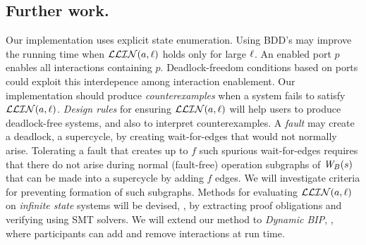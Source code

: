 \subsection{Further work.} 
Our implementation uses explicit state enumeration. %
Using BDD's may improve the running time 
when $\mathcal{LLIN}(a, \ell)$ holds only for large $\ell$.
%
An enabled port $p$ enables all interactions containing $p$.
Deadlock-freedom conditions based on ports could exploit
this interdepence among interaction enablement.
%
Our implementation should produce \emph{counterexamples} when a system
fails to satisfy $\mathcal{LLIN}(a, \ell)$.
%
\emph{Design rules} for ensuring $\mathcal{LLIN}(a, \ell)$ will help users to
produce deadlock-free systems, and also to interpret counterexamples.
%
A \emph{fault} may create a deadlock,  \ie a supercycle, by creating 
wait-for-edges that would not normally arise.
Tolerating a fault that creates up to $f$ such spurious wait-for-edges 
requires that there do not arise during normal
(fault-free) operation subgraphs of $\mathit{W}_{B}({s})$ that can be made into a
supercycle by adding $f$ edges. 
We will investigate criteria for preventing formation of such subgraphs.
%
Methods for evaluating $\mathcal{LLIN}(a, \ell)$ on \emph{infinite state} systems will be
devised, \eg, by extracting proof obligations and verifying using SMT solvers.
%
We will extend our method to \emph{Dynamic BIP},
\cite{DBLP:conf/soco/BozgaJMS12}, where participants can add and remove
interactions at run time.


